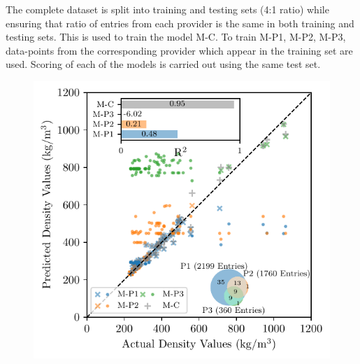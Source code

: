 \documentclass{article}
\begin{document}
	The complete dataset is split into training and testing sets (4:1 ratio) while ensuring that ratio of entries from each provider is the same in both training and testing sets. This is used to train the model M-C. To train M-P1, M-P2, M-P3, data-points from the corresponding provider which appear in the training set are used. Scoring of each of the models is carried out using the same test set. 
%	
%	
%	
	
	

	\begin{figure}[h]
		\centering
		\includegraphics[]{scatterPlot.pdf}
		\caption{} 
		\label{fig: exampleFig}
	\end{figure}
\end{document}
